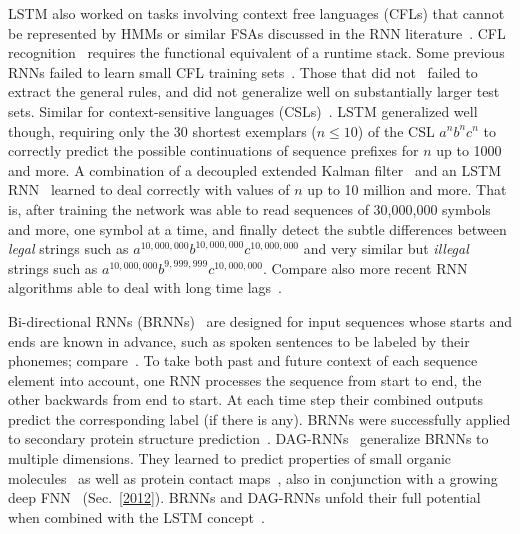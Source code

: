 \documentclass[letterpaper]{article}
\begin{document}
\begin{sloppypar}
LSTM also worked on tasks involving
context free languages (CFLs) that cannot be represented by HMMs or similar FSAs
discussed in the RNN literature~\citep{Sun93:abRNN,wiles95learning,andrews1995,steijvers96recurrent,tonkes97learning,Rodriguez:1999CS,Rodriguez+Wiles:1998:nips10}.
CFL recognition~\citep{lee-learning:96} requires the functional equivalent of a runtime stack.
Some previous RNNs failed to learn small
CFL training sets~\citep{Rodriguez+Wiles:1998:nips10}.
Those that did not~\citep{Rodriguez:1999CS,boden00context-free}
failed to extract the
general rules, and did not generalize
well on substantially larger test sets.
Similar for context-sensitive languages (CSLs)~\citep[e.g.,][]{ChalupBlairNN2003}.
LSTM generalized  well though,
requiring only the 30 shortest exemplars
($n \leq 10$) of the CSL $a^nb^nc^n$ to
correctly predict the possible continuations of sequence prefixes
for $n$ up to 1000 and more.
A combination of a decoupled extended Kalman filter~\citep{kalman1960,williams1992kalman,Puskorius:94,feldkamp1998kalman,haykin2001,feldkamp2003}
and an LSTM RNN~\citep{Perez:02}
learned to deal correctly with values of $n$ up to 10 million and more.
That is, after training the network was able to
read sequences of 30,000,000 symbols and more,
one symbol at a time, and
finally detect the subtle differences between
{\em legal} strings such as
$a^{10,000,000}b^{10,000,000}c^{10,000,000}$
and
very similar but {\em illegal} strings such as
$a^{10,000,000}b^{9,999,999}c^{10,000,000}$.
Compare also more recent RNN algorithms able to deal with long
time lags~\citep{DBLP:conf/icann/SchaferUZ06,Martens:2011hessfree,DBLP:series/lncs/ZimmermannTG12,icml2014}.



Bi-directional RNNs (BRNNs)~\citep{schuster97bidirectional,schuster99thesis} are designed for input sequences whose
starts and ends are known in advance, such as spoken sentences to be labeled by their phonemes; compare~\citep{fukada99boundary}. 
To take both past and future context of each sequence element into account,
one RNN processes the sequence from start to end, 
the other backwards from end to start. 
At each time step their combined outputs predict the corresponding label (if there is any).
BRNNs were successfully applied to secondary protein structure 
prediction~\citep{baldi99exploiting}.
DAG-RNNs~\citep{baldi2003jmlr,wu2008go} generalize BRNNs to multiple dimensions.
 They
learned to predict properties of small organic molecules~\citep{lusci2013}
as well as
protein contact maps~\citep{tegge2009},
also in conjunction with a growing deep FNN~\citep{baldi2012contact} (Sec.~\ref{2012}).
BRNNs and DAG-RNNs unfold their full potential when
combined with the LSTM concept~\citep{graves05nn,graves:2009nips,Graves:09tpami}.



\end{sloppypar}
\end{document}
